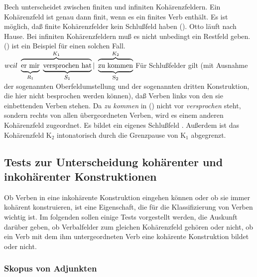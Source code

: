 Bech unterscheidet zwischen finiten und infiniten Kohärenzfeldern. Ein Kohärenzfeld ist genau
dann finit, wenn es ein finites Verb enthält. Es ist möglich, daß finite Kohärenzfelder 
kein Schlußfeld haben ().
\ea
Otto läuft nach Hause.
\z
Bei infiniten Kohärenzfeldern muß es nicht unbedingt ein Restfeld geben. () ist ein Beispiel
für einen solchen Fall.
\ea
${weil~\overbrace{\underbrace{\rule[-0.5ex]{0cm}{2.5ex}{\textrm{er~mir}}
                                   }_{R_1}~
                        \underbrace{\textrm{versprochen~hat}
                                   }_{\mbox{\footnotesize $S_1$}}}^{K_1}|~
        \overbrace{\underbrace{\rule[-0.5ex]{0cm}{2.5ex}{\textrm{zu~kommen}}
                              }_{\mbox{\footnotesize S$_2$}}}^{K_2}}$
\z
Für Schlußfelder gilt (mit Ausnahme der sogenannten Oberfeldumstellung und
der sogenannten dritten Konstruktion, die hier nicht besprochen werden
können), daß Verben links von den sie einbettenden Verben stehen. Da \emph{zu kommen} in ()
nicht vor \emph{versprochen} steht, sondern rechts von allen übergeordneten Verben, wird es einem
anderen Kohärenzfeld zugeordnet. Es bildet ein eigenes Schlußfeld \citep[\S 78]{Bech55a}. Außerdem
ist das Kohärenzfeld K$_2$ intonatorisch durch die Grenzpause von K$_1$ abgegrenzt.

\subsection{Tests zur Unterscheidung kohärenter und inkohärenter Konstruktionen}
\label{sec-coh-incoh}

Ob Verben in eine inkohärente Konstruktion eingehen können oder ob sie immer kohärent konstruieren,
ist eine Eigenschaft, die für die Klassifizierung von Verben wichtig ist. Im folgenden sollen einige
Tests vorgestellt werden, die Auskunft darüber geben, ob Verbalfelder zum gleichen Kohärenzfeld
gehören oder nicht, \dash ob ein Verb mit dem ihm untergeordneten Verb eine kohärente Konstruktion
bildet oder nicht.

\subsubsection{Skopus von Adjunkten}
\label{sec-skopus-kohaerent}

